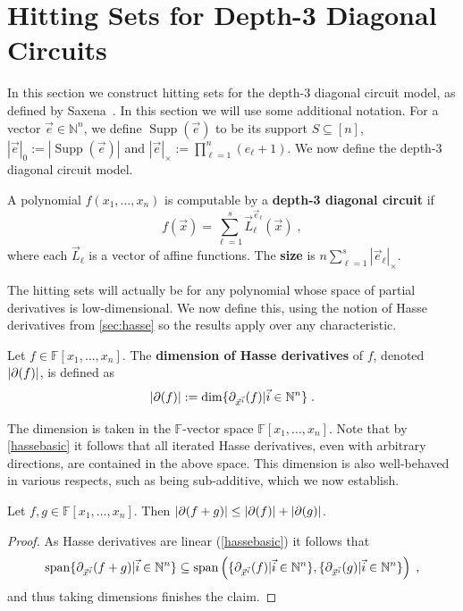 \documentclass[letterpaper,11pt]{article}
\numberwithin{equation}{section}
\theoremstyle{plain}
\theoremstyle{remark}
\DeclareMathOperator{\spn}{span}
\DeclareMathOperator{\supp}{Supp}
\newcommand{\F}{\mathbb{F}}
\newcommand{\N}{\mathbb{N}}
\newcommand{\eqdef}{:=}
\begin{document}
\section{Hitting Sets for Depth-3 Diagonal Circuits}\label{sec:diagonal}

In this section we construct hitting sets for the depth-3 diagonal circuit model, as defined by Saxena~\cite{Saxena08}. In this section we will use some additional notation.  For a vector $\vec{e}\in\N^n$, we define $\supp(\vec{e})$ to be its support $S\subseteq[n]$, $|\vec{e}|_0\eqdef|\supp(\vec{e})|$ and $|\vec{e}|_\times\eqdef\prod_{\ell=1}^n(e_\ell+1)$.  We now define the depth-3 diagonal circuit model.

\begin{definition}\label{def: diagonal}
	A polynomial $f(x_1,\ldots,x_n)$ is computable by a \textbf{depth-3 diagonal circuit} if
	\[
		f(\vec{x})=\sum_{\ell=1}^s\vec{L}_\ell^{\vec{e}_\ell}(\vec{x})\;,
	\]
	where each $\vec{L}_\ell$ is a vector of affine functions. The \textbf{size} is $n\sum_{\ell=1}^s|\vec{e}_\ell|_\times$.
\end{definition}

The hitting sets will actually be for any polynomial whose space of partial derivatives is low-dimensional.  We now define this, using the notion of Hasse derivatives from \autoref{sec:hasse} so the results apply over any characteristic.

\begin{definition}
	Let $f\in\F[x_1,\ldots,x_n]$. The \textbf{dimension of Hasse derivatives} of $f$, denoted $|\partial(f)|$, is defined as
	\[
		|\hasse(f)|\eqdef \dim\{\hasse_{\vec{x}^{\vec{i}}}(f)|\vec{i}\in\N^n\}\;.
	\]
\end{definition}

The dimension is taken in the $\F$-vector space $\F[x_1,\ldots,x_n]$. Note that by \autoref{hassebasic} it follows that all iterated Hasse derivatives, even with arbitrary directions, are contained in the above space.  This dimension is also well-behaved in various respects, such as being sub-additive, which we now establish.

\begin{lemma}
	\label{hassedimsubadditive}
	Let $f,g\in\F[x_1,\ldots,x_n]$.  Then $|\partial(f+g)|\le|\partial(f)|+|\partial(g)|$.
\end{lemma}
\begin{proof}
	As Hasse derivatives are linear (\autoref{hassebasic}) it follows that
	\[
		\spn\{\hasse_{\vec{x}^{\vec{i}}}(f+g)|\vec{i}\in\N^n\}
		\subseteq
		\spn\left(\{\hasse_{\vec{x}^{\vec{i}}}(f)|\vec{i}\in\N^n\},
			\{\hasse_{\vec{x}^{\vec{i}}}(g)|\vec{i}\in\N^n\}\right)\;,
	\]
	and thus taking dimensions finishes the claim.
\end{proof}
\end{document}
